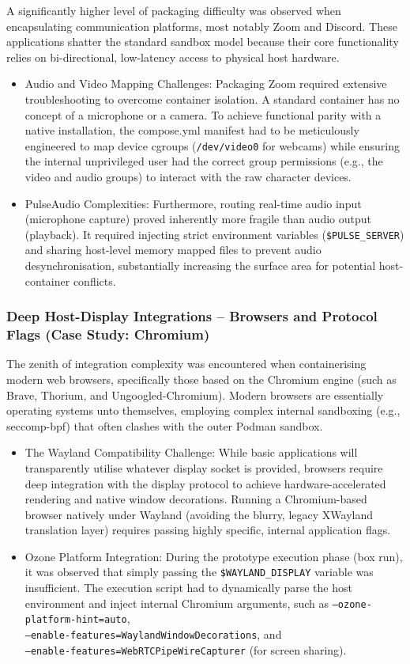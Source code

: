 \documentclass[journal,onecolumn]{IEEEtran}
\newcommand{\code}[1]{\texttt{#1}}
\begin{document}
A significantly higher level of packaging difficulty was observed when encapsulating communication platforms, most notably Zoom and Discord. These applications shatter the standard sandbox model because their core functionality relies on bi-directional, low-latency access to physical host hardware.
\begin{itemize}
    \item Audio and Video Mapping Challenges: Packaging Zoom required extensive troubleshooting to overcome container isolation. A standard container has no concept of a microphone or a camera. To achieve functional parity with a native installation, the compose.yml manifest had to be meticulously engineered to map device cgroups (\code{/dev/video0} for webcams) while ensuring the internal unprivileged user had the correct group permissions (e.g., the video and audio groups) to interact with the raw character devices.
    \item PulseAudio Complexities: Furthermore, routing real-time audio input (microphone capture) proved inherently more fragile than audio output (playback). It required injecting strict environment variables (\code{\$PULSE\_SERVER}) and sharing host-level memory mapped files to prevent audio desynchronisation, substantially increasing the surface area for potential host-container conflicts.
\end{itemize}

\subsubsection{Deep Host-Display Integrations – Browsers and Protocol Flags (Case Study: Chromium)}

The zenith of integration complexity was encountered when containerising modern web browsers, specifically those based on the Chromium engine (such as Brave, Thorium, and Ungoogled-Chromium). Modern browsers are essentially operating systems unto themselves, employing complex internal sandboxing (e.g., seccomp-bpf) that often clashes with the outer Podman sandbox.

\begin{itemize}
    \item The Wayland Compatibility Challenge: While basic applications will transparently utilise whatever display socket is provided, browsers require deep integration with the display protocol to achieve hardware-accelerated rendering and native window decorations. Running a Chromium-based browser natively under Wayland (avoiding the blurry, legacy XWayland translation layer) requires passing highly specific, internal application flags.
    \item Ozone Platform Integration: During the prototype execution phase (box run), it was observed that simply passing the \code{\$WAYLAND\_DISPLAY} variable was insufficient. The execution script had to dynamically parse the host environment and inject internal Chromium arguments, such as \code{--ozone-platform-hint=auto}, \\\code{--enable-features=WaylandWindowDecorations}, and \\\code{--enable-features=WebRTCPipeWireCapturer} (for screen sharing).
\end{itemize}
\end{document}
